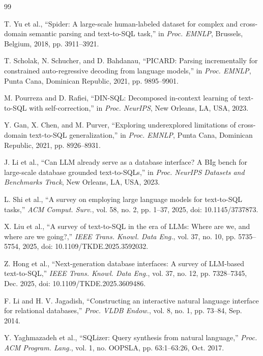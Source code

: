 \documentclass[journal]{IEEEtran}
\begin{document}
\begin{thebibliography}{99}

	T. Yu et al., ``Spider: A large-scale human-labeled dataset for complex and cross-domain semantic parsing and text-to-SQL task,'' in \textit{Proc. EMNLP}, Brussels, Belgium, 2018, pp. 3911--3921.

	T. Scholak, N. Schucher, and D. Bahdanau, ``PICARD: Parsing incrementally for constrained auto-regressive decoding from language models,'' in \textit{Proc. EMNLP}, Punta Cana, Dominican Republic, 2021, pp. 9895--9901.

	M. Pourreza and D. Rafiei, ``DIN-SQL: Decomposed in-context learning of text-to-SQL with self-correction,'' in \textit{Proc. NeurIPS}, New Orleans, LA, USA, 2023.

	Y. Gan, X. Chen, and M. Purver, ``Exploring underexplored limitations of cross-domain text-to-SQL generalization,'' in \textit{Proc. EMNLP}, Punta Cana, Dominican Republic, 2021, pp. 8926--8931.

	J. Li et al., ``Can LLM already serve as a database interface? A BIg bench for large-scale database grounded text-to-SQLs,'' in \textit{Proc. NeurIPS Datasets and Benchmarks Track}, New Orleans, LA, USA, 2023.

	L. Shi et al., ``A survey on employing large language models for text-to-SQL tasks,'' \textit{ACM Comput. Surv.}, vol. 58, no. 2, pp. 1--37, 2025, doi: 10.1145/3737873.

	X. Liu et al., ``A survey of text-to-SQL in the era of LLMs: Where are we, and where are we going?,'' \textit{IEEE Trans. Knowl. Data Eng.}, vol. 37, no. 10, pp. 5735--5754, 2025, doi: 10.1109/TKDE.2025.3592032.

	Z. Hong et al., ``Next-generation database interfaces: A survey of LLM-based text-to-SQL,'' \textit{IEEE Trans. Knowl. Data Eng.}, vol. 37, no. 12, pp. 7328--7345, Dec. 2025, doi: 10.1109/TKDE.2025.3609486.

	F. Li and H. V. Jagadish, ``Constructing an interactive natural language interface for relational databases,'' \textit{Proc. VLDB Endow.}, vol. 8, no. 1, pp. 73--84, Sep. 2014.

	Y. Yaghmazadeh et al., ``SQLizer: Query synthesis from natural language,'' \textit{Proc. ACM Program. Lang.}, vol. 1, no. OOPSLA, pp. 63:1--63:26, Oct. 2017.


\end{thebibliography}
\end{document}
